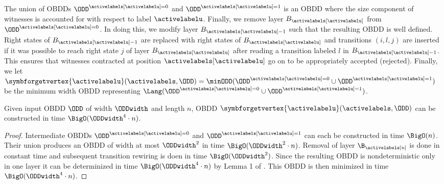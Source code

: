 The union of OBDDs $\ODD^{\activelabels[\activelabelu]=0}$ and $\ODD^{\activelabels[\activelabelu]=1}$ is an OBDD where the size component of witnesses is accounted for with respect to label $\activelabelu$. Finally, we remove layer $B_{\activelabels[\activelabelu]}$ from $\ODD^{\activelabels[\activelabelu]=0}$. In doing this, we modify layer $B_{\activelabels[\activelabelu]-1}$ such that the resulting OBDD is well defined. Right states of $B_{\activelabels[\activelabelu]-1}$ are replaced with right states of $B_{\activelabels[\activelabelu]}$ and transitions $(i,l,j)$ are inserted if it was possible to reach right state $j$ of layer $B_{\activelabels[\activelabelu]}$ after reading a transition labeled $l$ in $B_{\activelabels[\activelabelu]-1}$. This ensures that witnesses contracted at position $\activelabels[\activelabelu]$ go on to be appropriately accepted (rejected). 
Finally, we let $\symbforgetvertex{\activelabelu}(\activelabels, \ODD) = \minODD(\ODD^{\activelabels[\activelabelu]=0}\cup\ODD^{\activelabels[\activelabelu]=1})$ be the minimum width OBDD representing $\Lang(\ODD^{\activelabels[\activelabelu]=0}\cup\ODD^{\activelabels[\activelabelu]=1})$.

\begin{proposition}\label{forgettime}
    Given input OBDD $\ODD$ of width $\ODDwidth$ and length $n$, OBDD $\symbforgetvertex{\activelabelu}(\activelabels, \ODD)$ can be constructed in time $\BigO(\ODDwidth^4 \cdot n)$. 
\end{proposition}
\begin{proof}
    Intermediate OBDDs $\ODD^{\activelabels[\activelabelu]=0}$ and $\ODD^{\activelabels[\activelabelu]=1}$ can each be constructed in time $\BigO(n)$. Their union produces an OBDD of width at most $\ODDwidth^2$ in time $\BigO(\ODDwidth^2\cdot n)$. Removal of layer $\B_{\activelabels[u]}$ is done in constant time and subsequent transition rewiring is doen in time $\BigO(\ODDwidth^2)$. Since the resulting OBDD is nondeterministic only in one layer it can be determinized in time $\BigO(\ODDwidth^4 \cdot n)$ by Lemma 1 of \cite{alferov2022}. This OBDD is then minimized in time $\BigO(\ODDwidth^4 \cdot n)$.  
\end{proof}


